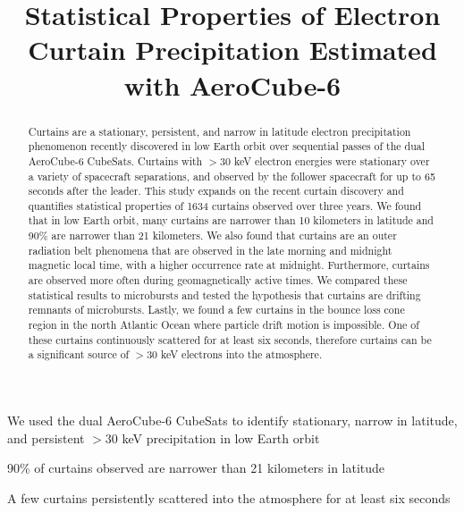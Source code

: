 \documentclass[draft]{agujournal2019}
\begin{document}
\title{Statistical Properties of Electron Curtain Precipitation Estimated with AeroCube-6}

%
%






\begin{keypoints}
\item We used the dual AeroCube-6 CubeSats to identify stationary, narrow in latitude, and persistent $>30$ keV precipitation in low Earth orbit
\item 90\% of curtains observed are narrower than 21 kilometers in latitude
\item A few curtains persistently scattered into the atmosphere for at least six seconds
\end{keypoints}


\begin{abstract}
Curtains are a stationary, persistent, and narrow in latitude electron precipitation phenomenon recently discovered in low Earth orbit over sequential passes of the dual AeroCube-6 CubeSats. Curtains with $> 30$ keV electron energies were stationary over a variety of spacecraft separations, and observed by the follower spacecraft for up to 65 seconds after the leader. This study expands on the recent curtain discovery and quantifies statistical properties of 1634 curtains observed over three years. We found that in low Earth orbit, many curtains are narrower than 10 kilometers in latitude and 90\% are narrower than 21 kilometers. We also found that curtains are an outer radiation belt phenomena that are observed in the late morning and midnight magnetic local time, with a higher occurrence rate at midnight. Furthermore, curtains are observed more often during geomagnetically active times. We compared these statistical results to microbursts and tested the hypothesis that curtains are drifting remnants of microbursts. Lastly, we found a few curtains in the bounce loss cone region in the north Atlantic Ocean where particle drift motion is impossible. One of these curtains continuously scattered for at least six seconds, therefore curtains can be a significant source of $> 30$ keV electrons into the atmosphere.
\end{abstract}
\end{document}
